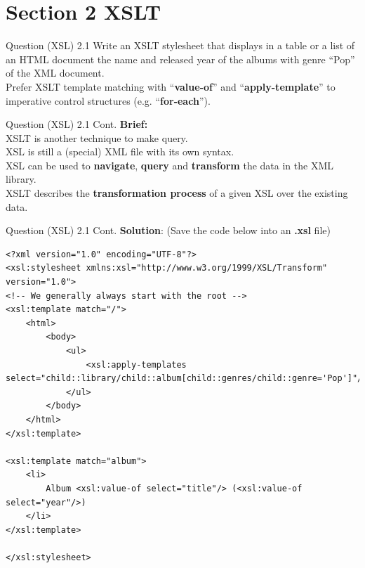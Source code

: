 \section*{Section 2 XSLT}
\begin{frame}[fragile]{Question (XSL) 2.1}
Write an XSLT stylesheet that displays in a table or a list of an HTML document the name and released year of the albums with genre “Pop” of the XML document.\\\vspace{5pt}
Prefer XSLT template matching with ``\textbf{value-of}'' and ``\textbf{apply-template}'' to imperative control structures (e.g. ``\textbf{for-each}'').\\\vspace{10pt}

\end{frame}

\begin{frame}[fragile]{Question (XSL) 2.1 Cont.}
\textbf{Brief:}\\\vspace{10pt}
XSLT is another technique to make query.\\\vspace{5pt}
XSL is still a (special) XML file with its own syntax.\\ \vspace{5pt}
XSL can be used to \textbf{navigate}, \textbf{query} and \textbf{transform} the data in the XML library.\\\vspace{5pt}
XSLT describes the \textbf{transformation process} of a given XSL over the existing data. 
\end{frame}

\begin{frame}[fragile]{Question (XSL) 2.1 Cont.}
\textbf{Solution}: (Save the code below into an \textbf{.xsl} file)\\
\begin{lstlisting}[style=xml-small-nomargin]
<?xml version="1.0" encoding="UTF-8"?>
<xsl:stylesheet xmlns:xsl="http://www.w3.org/1999/XSL/Transform" version="1.0">
<!-- We generally always start with the root -->
<xsl:template match="/">
	<html>
		<body>
			<ul>
				<xsl:apply-templates select="child::library/child::album[child::genres/child::genre='Pop']"/>
			</ul>
		</body>
	</html>
</xsl:template>

<xsl:template match="album">
	<li>
		Album <xsl:value-of select="title"/> (<xsl:value-of select="year"/>)
	</li>
</xsl:template>

</xsl:stylesheet>
\end{lstlisting}\vspace{5pt}

\end{frame}

